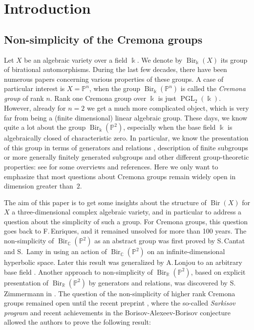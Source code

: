 \documentclass[11pt]{article}
\numberwithin{equation}{section}
\DeclareMathOperator{\Bir}{Bir}
\DeclareMathOperator{\PGL}{PGL}
\theoremstyle{plain}
\theoremstyle{definition}
\newcommand{\CC}{\mathbb C}
\newcommand{\kk}{\Bbbk}
\newcommand{\RR}{\mathbb R}
\newcommand{\PP}{\mathbb P}
\begin{document}
\section{Introduction}\label{sec:intro}

\subsection{Non-simplicity of the Cremona groups} Let $X$ be an algebraic variety over a field $\kk$. We denote by $\Bir_\kk(X)$ its group of birational automorphisms. During the last few decades, there have been numerous papers concerning various properties of these groups. A case of particular interest is $X=\PP^n$, when the group $\Bir_\kk(\PP^n)$ is called the \emph{Cremona group} of rank $n$. Rank one Cremona group over $\kk$ is just $\PGL_2(\kk)$. However, already for $n=2$ we get a much more complicated object, which is very far from being a (finite dimensional) linear algebraic group. These days, we know quite a lot about the group $\Bir_\kk(\PP^2)$, especially when the base field $\kk$ is algebraically closed of characteristic zero. In particular, we know the presentation of this group in terms of generators and relations \cite{Gizatullin,IKT,UZ}, description of finite subgroups \cite{DI} or more generally finitely generated subgroups and other different group-theoretic properties: see \cite{Cantat13,Deserti19} for some overviews and references. Here we only want to emphasize that most questions about Cremona groups remain widely open in dimension greater than~$2$.

The aim of this paper is to get some insights about the structure of $\Bir(X)$ for $X$ a three-dimensional complex algebraic variety, and in particular to address a question about the simplicity of such a group. For Cremona groups, this question goes back to F.\,Enriques, and it remained unsolved for more than 100 years. The non-simplicity of $\Bir_\CC(\PP^2)$ as an abstract group was first proved by S.\,Cantat and S.~Lamy in \cite{CantatLamy} using an action of $\Bir_\CC(\PP^2)$ on an infinite-dimensional hyperbolic space. Later this result was generalized by A.\,Lonjou to an arbitrary base field \cite{Lonjou}. Another approach to non-simplicity of $\Bir_\RR(\PP^2)$, based on explicit presentation of $\Bir_\RR(\PP^2)$ by generators and relations, was discovered by S.\,Zimmermann in \cite{Zimmermann}. The question of the non-simplicity of higher rank Cremona groups remained open until the recent preprint \cite{BLZ}, where the so-called \emph{Sarkisov program} and recent achievements in the Borisov-Alexeev-Borisov conjecture \cite{BirkarA} allowed the authors to prove the following result:
\end{document}
